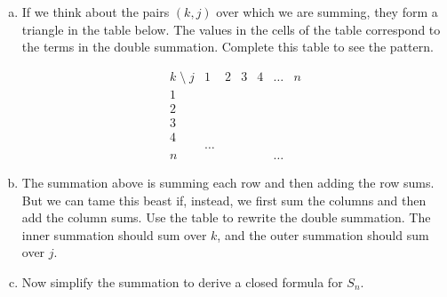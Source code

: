 \documentclass[12pt]{article}
\begin{document}
    \begin{enumerate}[(a)]
    \item 
    If we think about the
  pairs $(k,j)$ over which we are summing, they form a triangle in the
  table below. The values in the cells of the table correspond to the
  terms in the double summation. Complete this table to see the pattern.

\[
\begin{array}{c|cccccc}
    k\; {\setminus} \;j &1&2&3&4&\dots&n\\
\hline
1& \\
2 &\\
3 \\
4 \\
 &\dots\\
n &&&&&\dots
\end{array}
\]


\item The summation above is summing each row and then adding the row
  sums.  But we can tame this beast if, instead, we first sum the
  columns and then add the column sums. Use the table to rewrite the
  double summation. The inner summation should sum over $k$, and the
  outer summation should sum over $j$.

\solution[\vspace{.5in}]{
\[ 
    S_n = \sum_{j=1}^n \sum_{k=j}^n 2^k.
\]
}

\item Now simplify the summation to derive a closed formula for $S_n$.


\end{enumerate}
\end{document}
